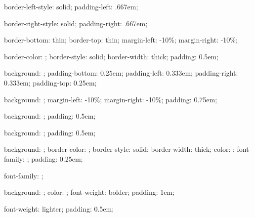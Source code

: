 %
{%
  border-left-style: solid;
  padding-left: .667em;
}


%
{%
  border-right-style: solid;
  padding-right: .667em;
}


%
{%
  border-bottom: thin;
  border-top: thin;
  margin-left: -10\%;
  margin-right: -10\%;
}


%
{%
  border-color: \@getcolor{\restrictedmaterialbordercolor};
  border-style: solid;
  border-width: thick;
  padding: 0.5em;
}


%
{%
  background: \@getcolor{\geeknotebackgroundcolor};
  padding-bottom: 0.25em;
  padding-left: 0.333em;
  padding-right: 0.333em;
  padding-top: 0.25em;
}




%
{%
  background: \@getcolor{\sectionbackgroundcolor};
  margin-left: -10\%;
  margin-right: -10\%;
  padding: 0.75em;
}


%
{%
  background: \@getcolor{\subsectionbackgroundcolor};
  padding: 0.5em;
}


%
{%
  background: \@getcolor{\subsubsectionbackgroundcolor};
  padding: 0.5em;
}


%
{%
  background: \@getcolor{\terminalbackgroundcolor};
  border-color: \@getcolor{\terminalbordercolor};
  border-style: solid;
  border-width: thick;
  color: \@getcolor{\terminalcolor};
  font-family: \fixedfontfamily;
  padding: 0.25em;
}


{
  font-family: \sansfontfamily;
}


%
{%
  background: \@getcolor{\titlebackgroundcolor};
  color: \@getcolor{\titleforegroundcolor};
  font-weight: bolder;
  padding: 1em;
}


%
{%
  font-weight: lighter;
  padding: 0.5em;
}


